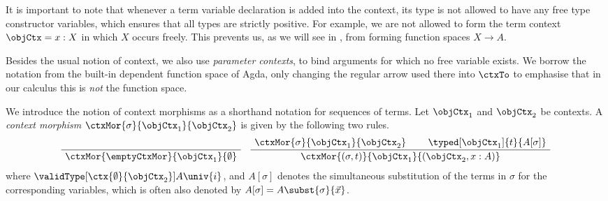 \documentclass[preprint]{sigplanconf}
\begin{document}
\begin{remark}
  It is important to note that whenever a term variable declaration is added
  into the context, its type is not allowed to have any free type constructor
  variables, which ensures that all types are strictly positive.
  For example, we are not allowed to form the term context
  $\objCtx = x : X$ in which $X$ occurs freely.
  This prevents us, as we will see in , from forming function
  spaces $X \to A$.
\qedDef
\end{remark}

Besides the usual notion of context, we also use \emph{parameter contexts},
to bind arguments for which no free variable exists.
We borrow the notation from the built-in dependent function space of Agda,
only changing the regular arrow used there into $\ctxTo$ to emphasise that in
our calculus this is \emph{not} the function space.

\begin{definition}
  \label{def:ctxmorph}
  We introduce the notion of context morphisms as a shorthand notation
  for sequences of terms.
  Let $\objCtx_1$ and $\objCtx_2$ be contexts.
  A \emph{context morphism} $\ctxMor{\sigma}{\objCtx_1}{\objCtx_2}$ is given by
  the following two rules.
  \begin{gather*}
    \AxiomC{}
    \UnaryInfC{$\ctxMor{\emptyCtxMor}{\objCtx_1}{\emptyset}$}
    \bottomAlignProof
    \DisplayProof
    \quad
    \AxiomC{$\ctxMor{\sigma}{\objCtx_1}{\objCtx_2}$}
    \AxiomC{$\typed[\objCtx_1]{t}{A [\sigma]}$}
    \BinaryInfC{$\ctxMor{(\sigma, t)}{\objCtx_1}{(\objCtx_2, x : A)}$}
    \bottomAlignProof
    \DisplayProof
  \end{gather*}
  where $\validType[\ctx{\emptyset}{\objCtx_2}]{A}{\univ{i}}$,
  and $A [\sigma]$ denotes the simultaneous substitution of the terms in $\sigma$
  for the corresponding variables, which is often also denoted by
  $A [\sigma] = A \subst{\sigma}{\vec{x}}$.
  \qedDef
\end{definition}
\end{document}
